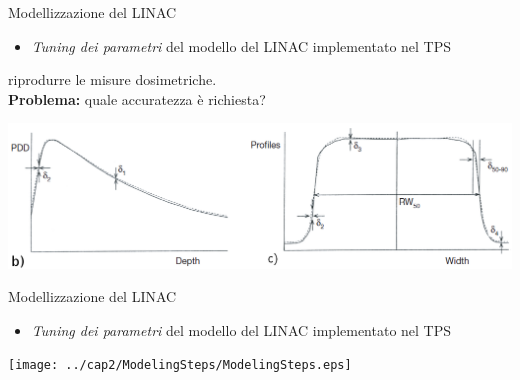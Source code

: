 \documentclass{beamer}
\begin{document}
\begin{frame}[t]{Modellizzazione del LINAC}
\begin{itemize}
\scriptsize
{}
\item \alert{\textit{Tuning dei parametri} del modello del LINAC implementato nel TPS}
\end{itemize}
\vspace{.2cm}

\footnotesize
{} riprodurre le misure dosimetriche.\\\vspace{.2cm}
\alert{\textbf{Problema:}} quale accuratezza è richiesta?\\

\begin{center}
\includegraphics[width=.9\textwidth]{../cap2/Accuracy_pdd_prof.png}
\end{center}


\end{frame}




\begin{frame}{Modellizzazione del LINAC}
\begin{itemize}
\scriptsize
{}
\item \alert{\textit{Tuning dei parametri} del modello del LINAC implementato nel TPS}
\end{itemize}
\vspace{.5cm}
\centering
\texttt{[image: ../cap2/ModelingSteps/ModelingSteps.eps]}
\end{frame}
\end{document}
